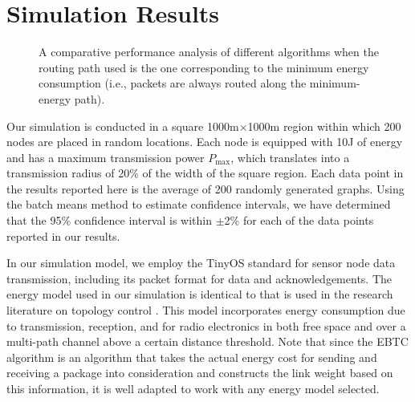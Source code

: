 \documentclass[journal,12pt,onecolumn]{IEEEtran}
\begin{document}
\section{Simulation Results}\label{sec:performance}
\begin{figure*}[!t]
\begin{center}
    \hskip0.2in
    \hskip0.2in
   \caption{A comparative performance analysis of different algorithms
     when the routing path used is the one corresponding to the minimum
     energy consumption (i.e., packets are always routed along the
     minimum-energy path). }\label{fig:Type1}
\end{center}
\vspace{-12pt}
\end{figure*}
Our simulation is conducted in a square 1000m$\times$1000m region
within which 200 nodes are placed in random locations. Each node is
equipped with 10J of energy and has a maximum transmission power
$P_{\text{max}}$, which translates into a transmission radius of 20\%
of the width of the square region. Each data point in the results
reported here is the average of 200 randomly generated graphs. Using
the batch means method to estimate confidence intervals, we have
determined that the 95\% confidence interval is within $\pm$2\% for
each of the data points reported in our results.

In our simulation
model, we employ the TinyOS standard \cite{tinyos} for sensor node
data transmission, including its packet format for data and
acknowledgements. The energy model used in our simulation is identical to that is used
in the research literature on topology control
\cite{HeiCha2002,KolPav2011}. This model incorporates
energy consumption due to transmission, reception, and for radio
electronics in both free space and over a multi-path channel above a
certain distance threshold. Note that since the EBTC algorithm is an algorithm that takes the actual energy cost for sending and receiving a package into consideration and constructs the link weight based on this information, it is well adapted to work with any energy model selected.
\end{document}

